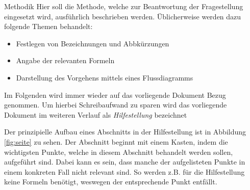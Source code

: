 %
\begin{simplebox}{Methodik}
%
Hier soll die Methode, welche zur Beantwortung der Fragestellung eingesetzt wird, ausführlich beschrieben werden.
Üblicherweise werden dazu folgende Themen behandelt:
%
\begin{itemize}
\item Festlegen von Bezeichnungen und Abbkürzungen 
\item Angabe der relevanten Formeln 

\item Darstellung des Vorgehens mittels eines Flussdiagramms 
\end{itemize}
%
\end{simplebox}
%
Im Folgenden wird immer wieder auf das vorliegende Dokument Bezug genommen. 
Um hierbei Schreibaufwand zu sparen wird das vorliegende Dokument im weiteren Verlauf als \textit{Hilfestellung} bezeichnet
\par
Der prinzipielle Aufbau eines Abschnitts in der Hilfestellung ist in Abbildung \ref{fig:seite} zu sehen.
Der Abschnitt beginnt mit einem Kasten, indem die wichtigsten Punkte, welche in diesem Abschnitt behandelt werden sollen, aufgeführt sind.
Dabei kann es sein, dass manche der aufgelisteten Punkte in einem konkreten Fall nicht relevant sind.
So werden z.B. für die Hilfestellung keine Formeln benötigt, weswegen der entsprechende Punkt entfällt. 
%
